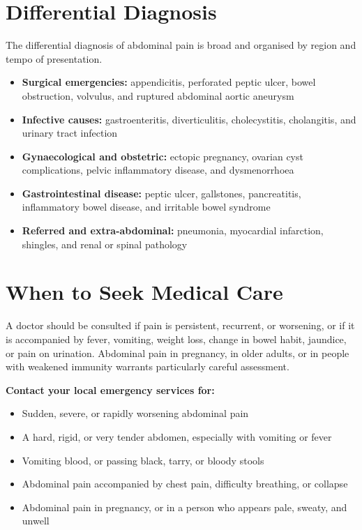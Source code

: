 \section*{Differential Diagnosis}
The differential diagnosis of abdominal pain is broad and organised by region and tempo of presentation.

\begin{itemize}
    \item \textbf{Surgical emergencies:} appendicitis, perforated peptic ulcer, bowel obstruction, volvulus, and ruptured abdominal aortic aneurysm
    \item \textbf{Infective causes:} gastroenteritis, diverticulitis, cholecystitis, cholangitis, and urinary tract infection
    \item \textbf{Gynaecological and obstetric:} ectopic pregnancy, ovarian cyst complications, pelvic inflammatory disease, and dysmenorrhoea
    \item \textbf{Gastrointestinal disease:} peptic ulcer, gallstones, pancreatitis, inflammatory bowel disease, and irritable bowel syndrome
    \item \textbf{Referred and extra-abdominal:} pneumonia, myocardial infarction, shingles, and renal or spinal pathology
\end{itemize}

\section*{When to Seek Medical Care}
A doctor should be consulted if pain is persistent, recurrent, or worsening, or if it is accompanied by fever, vomiting, weight loss, change in bowel habit, jaundice, or pain on urination. Abdominal pain in pregnancy, in older adults, or in people with weakened immunity warrants particularly careful assessment.

\textbf{Contact your local emergency services for:}
\begin{itemize}
    \item Sudden, severe, or rapidly worsening abdominal pain
    \item A hard, rigid, or very tender abdomen, especially with vomiting or fever
    \item Vomiting blood, or passing black, tarry, or bloody stools
    \item Abdominal pain accompanied by chest pain, difficulty breathing, or collapse
    \item Abdominal pain in pregnancy, or in a person who appears pale, sweaty, and unwell
\end{itemize}

